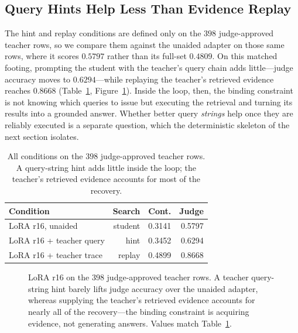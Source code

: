 \documentclass[11pt]{article}
\begin{document}
\subsection{Query Hints Help Less Than Evidence Replay}

The hint and replay conditions are defined only on the $398$ judge-approved teacher rows, so we compare them against the unaided adapter on those same rows, where it scores $0.5797$ rather than its full-set $0.4809$. On this matched footing, prompting the student with the teacher's query chain adds little---judge accuracy moves to $0.6294$---while replaying the teacher's retrieved evidence reaches $0.8668$ (Table~\ref{tab:queryhint}, Figure~\ref{fig:gap}). Inside the loop, then, the binding constraint is not knowing which queries to issue but executing the retrieval and turning its results into a grounded answer. Whether better query \emph{strings} help once they are reliably executed is a separate question, which the deterministic skeleton of the next section isolates.

\begin{table}[t]
\centering
\small
\begin{tabular}{lrrr}
\toprule
\textbf{Condition} & \textbf{Search} & \textbf{Cont.} & \textbf{Judge} \\
\midrule
LoRA r16, unaided & student & 0.3141 & 0.5797 \\
LoRA r16 + teacher query & hint & 0.3452 & 0.6294 \\
LoRA r16 + teacher trace & replay & 0.4899 & 0.8668 \\
\bottomrule
\end{tabular}
\caption{All conditions on the $398$ judge-approved teacher rows. A query-string hint adds little inside the loop; the teacher's retrieved evidence accounts for most of the recovery.}
\label{tab:queryhint}
\end{table}

\begin{figure}[t]
\centering
{}
\caption{LoRA r16 on the $398$ judge-approved teacher rows. A teacher query-string hint barely lifts judge accuracy over the unaided adapter, whereas supplying the teacher's retrieved evidence accounts for nearly all of the recovery---the binding constraint is acquiring evidence, not generating answers. Values match Table~\ref{tab:queryhint}.}
\label{fig:gap}
\end{figure}
\end{document}
